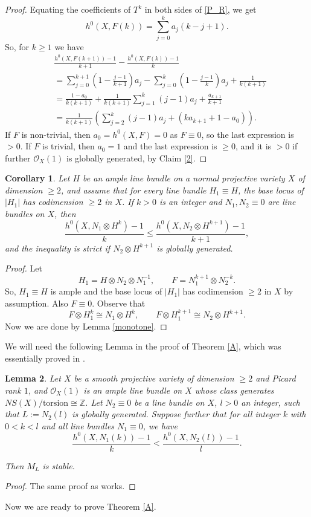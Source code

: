 \documentclass[11pt,letterpaper]{amsart}
\newtheorem{lemma}{Lemma}[section]
\newtheorem{corollary}[lemma]{Corollary}
\begin{document}
\begin{proof}
Equating the coefficients of $T^k$ in both sides of \eqref{P_R}, we get
\[
h^0(X,F(k))
=
\sum_{j=0}^{k}a_j(k-j+1).
\]
So, for $k\ge 1$ we have
\begin{align*}
&\frac{h^0(X,F(k+1))-1}{k+1}
-\frac{h^0(X,F(k))-1}{k} \\
&=
\sum_{j=0}^{k+1}\left(1-\frac{j-1}{k+1}\right)a_j
-
\sum_{j=0}^{k}\left(1-\frac{j-1}{k}\right)a_j +\frac{1}{k(k+1)}\\
&=
\frac{1-a_0}{k(k+1)}
+\frac{1}{k(k+1)}
\sum_{j=1}^{k}(j-1)a_j
+\frac{a_{k+1}}{k+1} \\
&=
\frac{1}{k(k+1)}
\left(
\sum_{j=2}^{k}(j-1)a_j
+(ka_{k+1}+1-a_0)
\right).
\end{align*}
If $F$ is non-trivial, then $a_0=h^0(X,F)=0$ as $F\equiv0$, so the last expression is $> 0$. If $F$ is trivial, then $a_0=1$ and the last expression is $\geq 0$, and it is $>0$ if further $\mathcal{O}_X(1)$ is globally generated,  by Claim \ref{2}.
\end{proof}
\begin{corollary}\label{key}
Let $H$ be an ample line bundle on a normal projective variety $X$ of
dimension $\geq 2$, and assume that for every line bundle $H_1\equiv H$, the base locus of $|H_1|$ has codimension $\geq 2$ in $X$. If $k>0$ is an integer and
$N_1,N_2\equiv0$ are line bundles on $X$, then
\begin{equation}\label{key1}
\frac{h^0(X,N_1\otimes H^k)-1}{k}
\le
\frac{h^0(X,N_2\otimes H^{k+1})-1}{k+1},
\end{equation} and the inequality is strict if $N_2\otimes H^{k+1}$ is globally generated.
\end{corollary}

\begin{proof}
Let
\[
H_1=H\otimes N_2\otimes N_1^{-1},
\qquad
F=N_1^{k+1}\otimes N_2^{-k}.
\]
So, $H_1\equiv H$ is ample and the base locus of $|H_1|$ has codimension $\geq 2$ in $X$ by assumption. Also $F\equiv0.$
Observe that
\[
F\otimes H_1^k
\cong
N_1\otimes H^k,
\qquad
F\otimes H_1^{k+1}
\cong
N_2\otimes H^{k+1}.
\]
Now we are done by Lemma \ref{monotone}.
\end{proof}
We will need the following Lemma in the proof of Theorem \ref{A}, which was essentially proved in \cite{jiang2025stability}.
\begin{lemma}\label{jr main}
Let $X$ be a smooth projective variety of dimension $\geq 2$ and Picard rank $1$, and $\mathcal O_X(1)$ is an ample line bundle on $X$ whose class generates
$NS(X)/\mathrm{torsion}\cong\mathbb Z$. Let $N_2\equiv0$ be a line bundle on $X$, $l>0$ an
integer, such that $L:=N_2(l)$
is globally generated.
Suppose further that for all integer $k$ with $0<k<l$ and all line bundles
$N_1\equiv0$, we have
\begin{equation}\label{jr}
\frac{h^0(X,N_1(k))-1}{k}
<
\frac{h^0(X,N_2(l))-1}{l}.
\end{equation}

Then $M_L$ is stable.
\end{lemma}
\begin{proof}
    The same proof as \cite[Theorem 1.1]{jiang2025stability} works.
\end{proof}
Now we are ready to prove Theorem \ref{A}.
\end{document}
